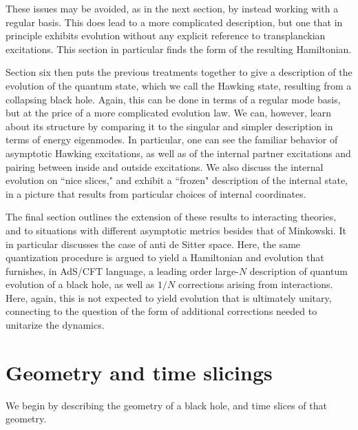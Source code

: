 \documentclass[12pt]{article}
\numberwithin{equation}{section}
\begin{document}
These issues may be avoided, as in the next section, by  instead working with a regular basis.  This does lead to a more complicated description, but one that in principle exhibits evolution without any explicit reference to transplanckian excitations.  This section in particular finds the form of the resulting Hamiltonian.  

Section six then puts the previous treatments together to give a description of the evolution of the quantum state, which we call the Hawking state, resulting from a collapsing black hole. Again, this can be done in terms of a regular mode basis, but at the price of a more complicated evolution law.  We can, however, learn about its structure by comparing it to the singular and simpler description in terms of energy eigenmodes.  In particular, one can see the familiar behavior of asymptotic Hawking excitations, as well as of the internal partner excitations and pairing between inside and outside excitations.  We also discuss the internal evolution on ``nice slices," and exhibit a ``frozen" description of the internal state, in a picture that results from particular choices of internal coordinates.  

The final section outlines the extension of these results to interacting theories, and to situations with different asymptotic metrics besides that of Minkowski.  It in particular discusses the case of anti de Sitter space.  Here, the same quantization procedure is argued to yield a Hamiltonian and evolution that furnishes, in AdS/CFT language, a leading order large-$N$ description of quantum evolution of a black hole, as well as $1/N$ corrections arising from interactions.  Here, again, this is not expected to yield evolution that is ultimately unitary, connecting to the question of the form of additional corrections needed to unitarize the dynamics.



\section{Geometry and time slicings}\label{Slicing}

We begin by describing the geometry of a black hole, and time slices of that geometry.
\end{document}
